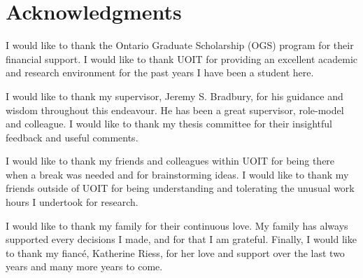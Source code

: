 \chapter*{Acknowledgments}
I would like to thank the Ontario Graduate Scholarship (OGS) program for their financial support. I would like to thank UOIT for providing an excellent academic and research environment for the past years I have been a student here.

I would like to thank my supervisor, Jeremy S. Bradbury, for his guidance and wisdom throughout this endeavour. He has been a great supervisor, role-model and colleague. I would like to thank my thesis committee for their insightful feedback and useful comments.

I would like to thank my friends and colleagues within UOIT for being there when a break was needed and for brainstorming ideas. I would like to thank my friends outside of UOIT for being understanding and tolerating the unusual work hours I undertook for research.

I would like to thank my family for their continuous love. My family has always supported every decisions I made, and for that I am grateful. Finally, I would like to thank my fianc\'{e}, Katherine Riess, for her love and support over the last two years and  many more years to come.
